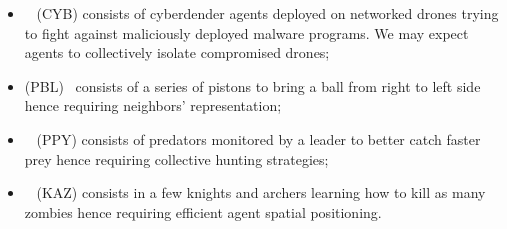 \documentclass[runningheads]{llncs}
\begin{document}
\hspace{-0.6cm}
\begin{minipage}[t]{0.61\textwidth}

    \begin{itemize}
        \item {}~\cite{cage_challenge_3_announcement} (CYB) consists of cyberdender agents deployed on networked drones trying to fight against maliciously deployed malware programs. We may expect agents to \allowbreak collectively isolate compromised drones;
        \item {} (PBL)~\cite{Terry2021} consists of a series of pistons to bring a ball from right to left side hence requiring neighbors' representation;
        \item {}~\cite{Lowe2017} (PPY) consists of predators monitored by a leader to better catch faster prey hence requiring collective hunting strategies;
        \item {}~\cite{Terry2021} (KAZ) consists in a few knights and archers learning how to kill as many zombies hence requiring efficient agent spatial positioning.
    \end{itemize}

\end{minipage}%
\hfill %
\end{document}
